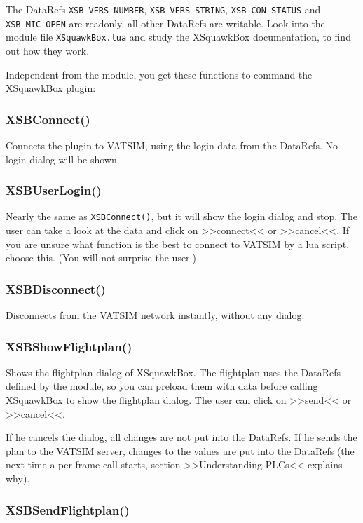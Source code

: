 \documentclass[11pt,parskip=half,a4paper]{scrartcl}
\begin{document}
The DataRefs \verb|XSB_VERS_NUMBER|, \verb|XSB_VERS_STRING|, \verb|XSB_CON_STATUS| and \verb|XSB_MIC_OPEN| are readonly, all other DataRefs are  writable. Look into the module file \verb|XSquawkBox.lua| and study the XSquawkBox documentation, to find out how they work.

Independent from the module, you get these functions to command the XSquawkBox plugin:

\subsubsection{XSBConnect()}

Connects the plugin to VATSIM, using the login data from the DataRefs. No login dialog will be shown.

\subsubsection{XSBUserLogin()}

Nearly the same as \verb|XSBConnect()|, but it will show the login dialog and stop. The user can take a look at the data and click on >>connect<< or >>cancel<<. If you are unsure what function is the best to connect to VATSIM by a lua script, choose this. (You will not surprise the user.)

\subsubsection{XSBDisconnect()}

Disconnects from the VATSIM network instantly, without any dialog.

\subsubsection{XSBShowFlightplan()}

Shows the flightplan dialog of XSquawkBox. The flightplan uses the DataRefs defined by the module, so you can preload them with data before calling XSquawkBox to show the flightplan dialog. The user can click on >>send<< or >>cancel<<.

If he cancels the dialog, all changes are not put into the DataRefs. If he sends the plan to the VATSIM server, changes to the values are put into the DataRefs (the next time a per-frame call starts, section >>Understanding PLCs<< explains why).

\subsubsection{XSBSendFlightplan()}
\end{document}
